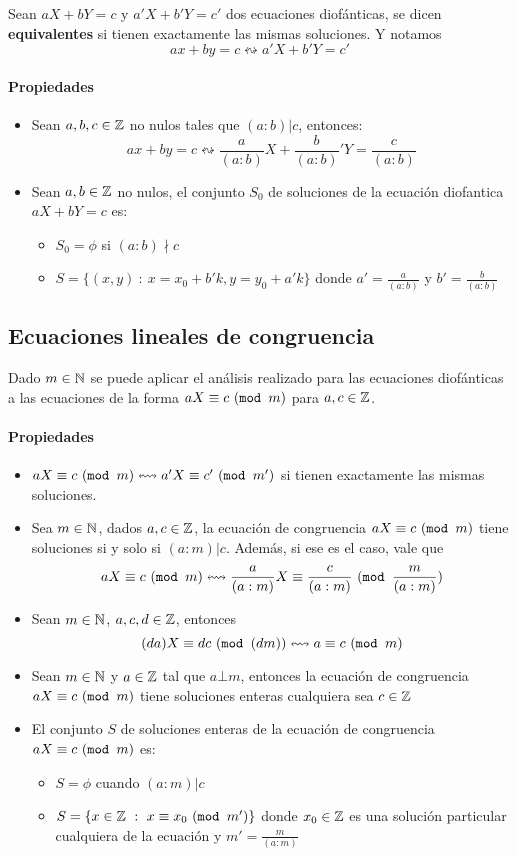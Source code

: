 Sean $aX+bY=c$ y $a'X+b'Y=c'$ dos ecuaciones diofánticas, se dicen \textbf{equivalentes} si tienen exactamente las mismas soluciones. Y notamos $$ax+by=c\leftrightsquigarrow a'X+b'Y=c'$$

\paragraph{Propiedades}
\begin{itemize}
\item Sean $a,b,c\in\mathbb{Z}$ no nulos tales que $(a:b)|c$, entonces:
$$ax+by=c\leftrightsquigarrow \frac{a}{(a:b)}X+\frac{b}{(a:b)}'Y=\frac{c}{(a:b)}$$
\item Sean $a,b\in\mathbb{Z}$ no nulos, el conjunto $S_0$ de soluciones de la ecuación diofantica $aX+bY=c$ es:
\begin{itemize}
\item $S_0 = \phi$ si $(a:b)\nmid c$
\item $S = \{(x,y)~:~x=x_0 + b'k, y=y_0 + a'k\}$ donde $a' = \frac{a}{(a:b)}$ y $b'=\frac{b}{(a:b)}$
\end{itemize}
\end{itemize}

\subsection{Ecuaciones lineales de congruencia}
Dado $m\in\mathbb{N}$ se puede aplicar el análisis realizado para las ecuaciones diofánticas a las ecuaciones de la forma $aX \equiv c ~(\texttt{mod } m)$ para $a,c\in\mathbb{Z}$.
\paragraph{Propiedades}
\begin{itemize}
\item $aX \equiv c ~(\texttt{mod } m)\leftrightsquigarrow a'X \equiv c' ~(\texttt{mod } m')$ si tienen exactamente las mismas soluciones.
\item Sea $m\in\mathbb{N}$, dados $a,c\in\mathbb{Z}$, la ecuación de congruencia $aX \equiv c ~(\texttt{mod } m)$ tiene soluciones si y solo si $(a:m)|c$. Además, si ese es el caso, vale que $$aX \equiv c ~(\texttt{mod } m)\leftrightsquigarrow\frac{a}{(a:m)}X \equiv \frac{c}{(a:m)} ~(\texttt{mod } \frac{m}{(a:m)})$$
\item Sean $m\in\mathbb{N}$, $a,c,d\in\mathbb{Z}$, entonces $$(da)X \equiv dc ~(\texttt{mod } (dm))\leftrightsquigarrow a \equiv c ~(\texttt{mod } m)$$
\item Sean $m\in\mathbb{N}$ y $a\in\mathbb{Z}$ tal que $a\bot m$, entonces la ecuación de congruencia $aX \equiv c ~(\texttt{mod } m)$ tiene soluciones enteras cualquiera sea $c\in\mathbb{Z}$
\item El conjunto $S$ de soluciones enteras de la ecuación de congruencia $aX \equiv c ~(\texttt{mod } m)$ es:
\begin{itemize}
\item $S=\phi$ cuando $(a:m)|c$
\item $S=\{x\in\mathbb{Z}~:~x \equiv x_0 ~(\texttt{mod } m')\}$ donde $x_0\in\mathbb{Z}$ es una solución particular cualquiera de la ecuación y $m' = \frac{m}{(a:m)}$
\end{itemize}
\end{itemize}
